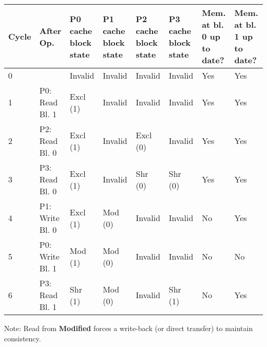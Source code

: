 \begin{enumerate}
    \begin{table}[!htp]
        \centering
        \begin{adjustbox}{width={\textwidth},totalheight={\textheight},keepaspectratio}
            \begin{tabular}{@{} l l p{4em} p{4em} p{4em} p{4em} p{3em} p{3em} @{}}
                \toprule
                \textbf{Cycle} & \textbf{After Op.} & \textbf{P0 cache block state} & \textbf{P1 cache block state} & \textbf{P2 cache block state} & \textbf{P3 cache block state} & \textbf{Mem. at bl. 0 up to date?} & \textbf{Mem. at bl. 1 up to date?} \\
                \midrule
                0   &                   & Invalid   & Invalid   & Invalid   & Invalid   & Yes   & Yes   \\ [.3em]
                1   & P0: Read Bl. 1    & Excl (1)  & Invalid   & Invalid   & Invalid   & Yes   & Yes   \\ [.3em]
                2   & P2: Read Bl. 0    & Excl (1)  & Invalid   & Excl (0)  & Invalid   & Yes   & Yes   \\ [.3em]
                3   & P3: Read Bl. 0    & Excl (1)  & Invalid   & Shr (0)   & Shr (0)   & Yes   & Yes   \\ [.3em]
                4   & P1: Write Bl. 0   & Excl (1)  & Mod (0)   & Invalid   & Invalid   & No    & Yes   \\ [.3em]
                5   & P0: Write Bl. 1   & Mod (1)   & Mod (0)   & Invalid   & Invalid   & No    & No    \\ [.3em]
                6   & P3: Read Bl. 1    & Shr (1)   & Mod (0)   & Invalid   & Shr (1)   & No    & Yes   \\
                \bottomrule
            \end{tabular}
        \end{adjustbox}
    \end{table}
\end{enumerate}
Note: Read from \textbf{Modified} forces a write-back (or direct transfer) to maintain consistency.

